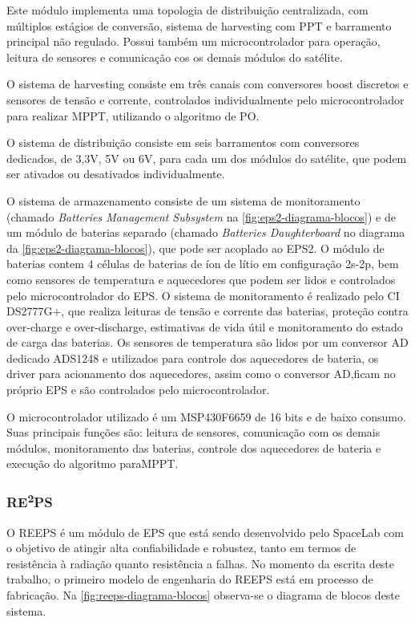 Este módulo implementa uma topologia de distribuição centralizada, com múltiplos estágios de conversão, sistema de harvesting com \gls{PPT} e barramento principal não regulado.
Possui também um microcontrolador para operação, leitura de sensores e comunicação cos os demais módulos do satélite.

O sistema de harvesting consiste em três canais com conversores boost discretos e sensores de tensão e corrente, controlados individualmente pelo microcontrolador para realizar \gls{MPPT}, utilizando o algoritmo de \gls{PO}.

O sistema de distribuição consiste em seis barramentos com conversores dedicados, de 3,3V, 5V ou 6V, para cada um dos módulos do satélite, que podem ser ativados ou desativados individualmente.

O sistema de armazenamento consiste de um sistema de monitoramento (chamado \textit{Batteries Management Subsystem} na \autoref{fig:eps2-diagrama-blocos}) e de um módulo de baterias separado (chamado \textit{Batteries Daughterboard} no diagrama da \autoref{fig:eps2-diagrama-blocos}), que pode ser acoplado ao \gls{EPS2}.
O módulo de baterias contem 4 células de baterias de íon de lítio em configuração 2s-2p, bem como sensores de temperatura e aquecedores que podem ser lidos e controlados pelo microcontrolador do \gls{EPS}.
O sistema de monitoramento é realizado pelo CI DS2777G+, que realiza leituras de tensão e corrente das baterias, proteção contra over-charge e over-discharge, estimativas de vida útil e monitoramento do estado de carga das baterias.
Os sensores de temperatura são lidos por um conversor AD dedicado ADS1248 e utilizados para controle dos aquecedores de bateria, os driver para acionamento dos aquecedores, assim como o conversor AD,ficam no próprio \gls{EPS} e são controlados pelo microcontrolador.

O microcontrolador utilizado é um MSP430F6659 de 16 bits e de baixo consumo.
Suas principais funções são: leitura de sensores, comunicação com os demais módulos, monitoramento das baterias, controle dos aquecedores de bateria e execução do algoritmo para\gls{MPPT}.


\subsubsection{\texorpdfstring{RE\textsuperscript{2}PS}{REEPS}}


O \gls{REEPS} é um módulo de \gls{EPS} que está sendo desenvolvido pelo SpaceLab com o objetivo de atingir alta confiabilidade e robustez, tanto em termos de resistência à radiação quanto resistência a falhas.
No momento da escrita deste trabalho, o primeiro modelo de engenharia do \gls{REEPS} está em processo de fabricação.
Na \autoref{fig:reeps-diagrama-blocos} observa-se o diagrama de blocos deste sistema.

